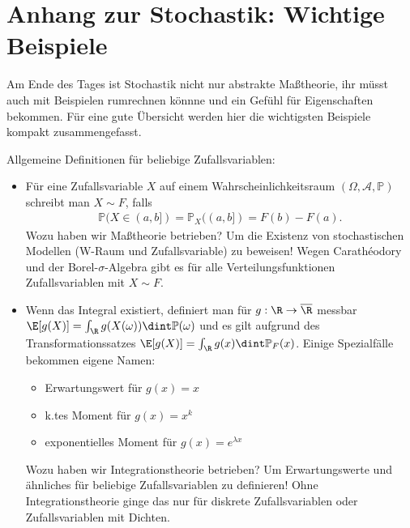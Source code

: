 \section{Anhang zur Stochastik: Wichtige Beispiele}
Am Ende des Tages ist Stochastik nicht nur abstrakte Ma\ss theorie, ihr m\"usst auch mit Beispielen rumrechnen k\"onnne und ein Gef\"uhl f\"ur Eigenschaften bekommen. F\"ur eine gute \"Ubersicht werden hier die wichtigsten Beispiele kompakt zusammengefasst.\smallskip

Allgemeine Definitionen f\"ur beliebige Zufallsvariablen:
\begin{itemize}
	\item F\"ur eine Zufallsvariable $X$ auf einem Wahrscheinlichkeitsraum $(\Omega, \mathcal A, \mathbb P)$ schreibt man $X\sim F$, falls 
	\begin{align*}
		\mathbb P(X\in (a,b])=\mathbb P_X((a,b])=F(b)-F(a).
	\end{align*}
	Wozu haben wir Ma\ss theorie betrieben? Um die Existenz von stochastischen Modellen (W-Raum und Zufallsvariable) zu beweisen! Wegen Carath\'eodory und der Borel-$\sigma$-Algebra gibt es f\"ur alle Verteilungsfunktionen Zufallsvariablen mit $X\sim F$.
	\item Wenn das Integral existiert, definiert man f\"ur $g:\R\to \overline \R$ messbar $\E[g(X)]=\int_\R g(X(\omega)) \dint \mathbb P(\omega)$ und es gilt aufgrund des Transformationssatzes $\E[g(X)]=\int_\R g(x) \dint \mathbb P_F(x)$. Einige Spezialf\"alle bekommen eigene Namen:
	\begin{itemize}
		\item Erwartungswert f\"ur $g(x)=x$
		\item k.tes Moment f\"ur $g(x)=x^k$
		\item exponentielles Moment f\"ur $g(x)=e^{\lambda x}$ 
	\end{itemize}
	 Wozu haben wir Integrationstheorie betrieben? Um Erwartungswerte und \"ahnliches f\"ur beliebige Zufallsvariablen zu definieren! Ohne Integrationstheorie ginge das nur f\"ur diskrete Zufallsvariablen oder Zufallsvariablen mit Dichten.
	 \end{itemize}


